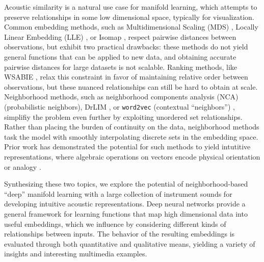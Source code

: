 \documentclass{article}
\begin{document}
Acoustic similarity is a natural use case for manifold learning, which attempts to preserve relationships in some low dimensional space, typically for visualization.
Common embedding methods, such as Multidimensional Scaling (MDS) \cite{}, Locally Linear Embedding (LLE) \cite{}, or Isomap \cite{}, respect pairwise distances between observations, but exhibit two practical drawbacks:
these methods do not yield general functions that can be applied to new data, and obtaining accurate pairwise distances for large datasets is not scalable.
Ranking methods, like WSABIE \cite{weston2011wsabie}, relax this constraint in favor of maintaining relative order between observations, but these nuanced relationships can still be hard to obtain at scale.
Neighborhood methods, such as neighborhood components analysis (NCA) \cite{hinton2004neighborhood} (probabilistic neighbors), DrLIM \cite{hadsell2006drlim}, or \texttt{word2vec} (contextual ``neighbors'') \cite{mikolov2013distributed}, simplifiy the problem even further by exploiting unordered set relationships.
Rather than placing the burden of continuity on the data, neighborhood methods task the model with smoothly interpolating discrete sets in the embedding space.
Prior work has demonstrated the potential for such methods to yield intutitive representations, where algebraic operations on vectors encode physical orientation \cite{hadsell2006drlim} or analogy \cite{mikolov2013efficient}.

Synthesizing these two topics, we explore the potential of neighborhood-based ``deep'' manifold learning with a large collection of instrument sounds for developing intuitive acoustic representations.
Deep neural networks provide a general framework for learning functions that map high dimensional data into useful embeddings, which we influence by considering different kinds of relationships between inputs.
The behavior of the resulting embeddings is evaluated through both quantitative and qualitative means, yielding a variety of insights and interesting multimedia examples.

\end{document}
